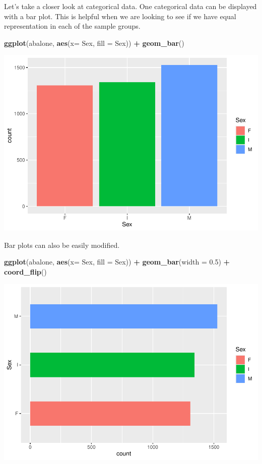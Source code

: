 \documentclass[
]{book}
\newenvironment{Shaded}{\begin{snugshade}}{\end{snugshade}}
\newcommand{\AttributeTok}[1]{\textcolor[rgb]{0.13,0.29,0.53}{#1}}
\newcommand{\FloatTok}[1]{\textcolor[rgb]{0.00,0.00,0.81}{#1}}
\newcommand{\FunctionTok}[1]{\textcolor[rgb]{0.13,0.29,0.53}{\textbf{#1}}}
\newcommand{\NormalTok}[1]{#1}
\newcommand{\SpecialCharTok}[1]{\textcolor[rgb]{0.81,0.36,0.00}{\textbf{#1}}}
\begin{document}
Let's take a closer look at categorical data. One categorical data can be displayed with a bar plot. This is helpful when we are looking to see if we have equal representation in each of the sample groups.

\begin{Shaded}
\begin{Highlighting}[]
\FunctionTok{ggplot}\NormalTok{(abalone, }\FunctionTok{aes}\NormalTok{(}\AttributeTok{x=}\NormalTok{ Sex, }\AttributeTok{fill =}\NormalTok{ Sex)) }\SpecialCharTok{+} 
  \FunctionTok{geom\_bar}\NormalTok{()}
\end{Highlighting}
\end{Shaded}

\includegraphics{_main_files/figure-latex/unnamed-chunk-48-1.pdf}

Bar plots can also be easily modified.

\begin{Shaded}
\begin{Highlighting}[]
\FunctionTok{ggplot}\NormalTok{(abalone, }\FunctionTok{aes}\NormalTok{(}\AttributeTok{x=}\NormalTok{ Sex, }\AttributeTok{fill =}\NormalTok{ Sex)) }\SpecialCharTok{+} 
  \FunctionTok{geom\_bar}\NormalTok{(}\AttributeTok{width =} \FloatTok{0.5}\NormalTok{) }\SpecialCharTok{+}
  \FunctionTok{coord\_flip}\NormalTok{()}
\end{Highlighting}
\end{Shaded}

\includegraphics{_main_files/figure-latex/unnamed-chunk-49-1.pdf}
\end{document}

